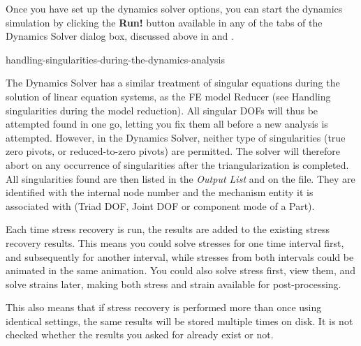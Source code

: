 {

Once you have set up the dynamics solver options, you can start the dynamics
simulation by clicking the \textbf{Run!} button available in any of the tabs
of the Dynamics Solver dialog box, discussed above in
 and
.


           {handling-singularities-during-the-dynamics-analysis}

The Dynamics Solver has a similar treatment of singular equations during
the solution of linear equation systems, as the FE model Reducer (see
           {Handling singularities during the model reduction}).
All singular DOFs will thus be attempted found in one go, letting you fix
them all before a new analysis is attempted. However, in the Dynamics Solver,
neither type of singularities (true zero pivots, or reduced-to-zero pivots) are
permitted. The solver will therefore abort on any occurrence of singularities
after the triangularization is completed.
All singularities found are then listed in the {\sl Output List} and on the
 file. They are identified with the internal node number and the
mechanism entity it is associated with (Triad DOF, Joint DOF or component mode
of a Part).





Each time stress recovery is run, the results are added to the existing stress
recovery results. This means you could solve stresses for one time interval
first, and subsequently for another interval, while stresses from both intervals
could be animated in the same animation.
You could also solve stress first, view them, and solve strains later,
making both stress and strain available for post-processing.

This also means that if stress recovery is performed more than once using
identical settings, the same results will be stored multiple times on disk.
It is not checked whether the results you asked for already exist or not.

}
